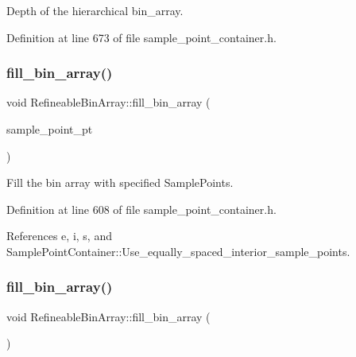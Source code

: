Depth of the hierarchical bin\+\_\+array. 



Definition at line 673 of file sample\+\_\+point\+\_\+container.\+h.

\mbox{\label{classRefineableBinArray_a8697312039bc33ac77d55545563b5597}} 
\subsubsection{\texorpdfstring{fill\+\_\+bin\+\_\+array()}{fill\_bin\_array()}\hspace{0.1cm}{\footnotesize\ttfamily [1/2]}}
{\footnotesize\ttfamily void Refineable\+Bin\+Array\+::fill\+\_\+bin\+\_\+array (\begin{DoxyParamCaption}\item[{const Vector$<$ \hyperlink{classSamplePoint}{Sample\+Point} $\ast$$>$ \&}]{sample\+\_\+point\+\_\+pt }\end{DoxyParamCaption})\hspace{0.3cm}{\ttfamily [inline]}}



Fill the bin array with specified Sample\+Points. 



Definition at line 608 of file sample\+\_\+point\+\_\+container.\+h.



References e, i, s, and Sample\+Point\+Container\+::\+Use\+\_\+equally\+\_\+spaced\+\_\+interior\+\_\+sample\+\_\+points.

\mbox{\label{classRefineableBinArray_a89a3c1f13eeceec0fb11e399cc58d57d}} 
\subsubsection{\texorpdfstring{fill\+\_\+bin\+\_\+array()}{fill\_bin\_array()}\hspace{0.1cm}{\footnotesize\ttfamily [2/2]}}
{\footnotesize\ttfamily void Refineable\+Bin\+Array\+::fill\+\_\+bin\+\_\+array (\begin{DoxyParamCaption}{ }\end{DoxyParamCaption})\hspace{0.3cm}{\ttfamily [private]}}



